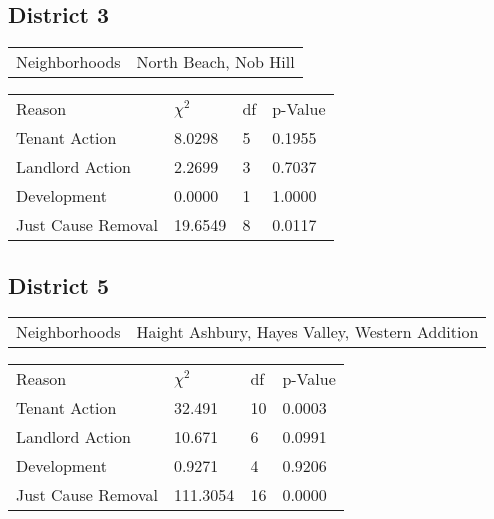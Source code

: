 \documentclass[]{article}
\begin{document}
\subsection{District 3}

\begin{table}[h]
	\centering
	\begin{tabular}{l | l}
		Neighborhoods & North Beach, Nob Hill \\
	\end{tabular}
\end{table}
\FloatBarrier

\begin {table}[h]
\centering
\begin{tabular}{l | l | l | l}
	
	Reason	&  $\chi ^{2}$ & df & p-Value \\
	Tenant Action 		  & 8.0298 &  5  &  0.1955    \\
	Landlord Action	      & 2.2699 &  3  &  0.7037    \\
	Development			  & 0.0000 &  1  &  1.0000    \\
	Just Cause Removal	  & 19.6549 &  8  &  0.0117    \\
\end{tabular} \newline
\end{table}
\FloatBarrier

\subsection{District 5}

\begin{table}[h]
	\centering
	\begin{tabular}{l | l}
		Neighborhoods & Haight Ashbury, Hayes Valley, Western Addition \\
	\end{tabular}
\end{table}
\FloatBarrier

\begin {table}[h]
\centering
\begin{tabular}{l | l | l | l}
	
	Reason				&  $\chi ^{2}$ & df & p-Value \\
	Tenant Action 		   &  32.491   &  10 & 0.0003 \\
	Landlord Action	       &  10.671  & 6  & 0.0991 \\
	Development			   &  0.9271  &  4 & 0.9206 \\
	Just Cause Removal	   &  111.3054  & 16  & 0.0000 \\
\end{tabular} \newline
\end{table}
\FloatBarrier
\end{document}
